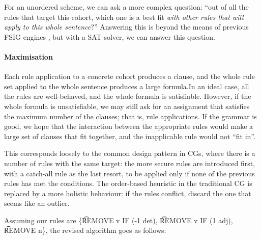 For an unordered scheme, we can ask a more complex question: ``out of all the rules that target this cohort, which one is a best fit \emph{with other rules that will apply to this whole sentence}?''
Answering this is beyond the means of previous FSIG engines , but with a SAT-solver, we can answer this question. 

\paragraph{Maximisation} 
Each rule application to a concrete cohort produces a clause,
and the whole rule set applied to the whole sentence produces 
a large formula.In an ideal case, all the rules are well-behaved, 
and the whole formula is satisfiable. However, if the whole formula 
is unsatisfiable, we may still ask for an assignment that satisfies 
the maximum number of the clauses; that is, rule applications. 
If the grammar is good, we hope that the interaction between 
the appropriate rules would make a large set of clauses that 
fit together, and the inapplicable rule would not ``fit in''.


This corresponds loosely to the common design pattern in CGs, 
where there is a number of rules with the same target: the more 
secure rules are introduced first, with a catch-all rule as 
the last resort, to be applied only if none of the previous rules 
has met the conditions.
The order-based heuristic in the traditional CG is replaced by a more
holistic behaviour: if the rules conflict, discard the one that seems
like an outlier.

Assuming our rules are \{\t{REMOVE v IF (-1 det)}, \t{REMOVE v IF (1 adj)}, \t{REMOVE n}\}, the revised algorithm goes as follows:

